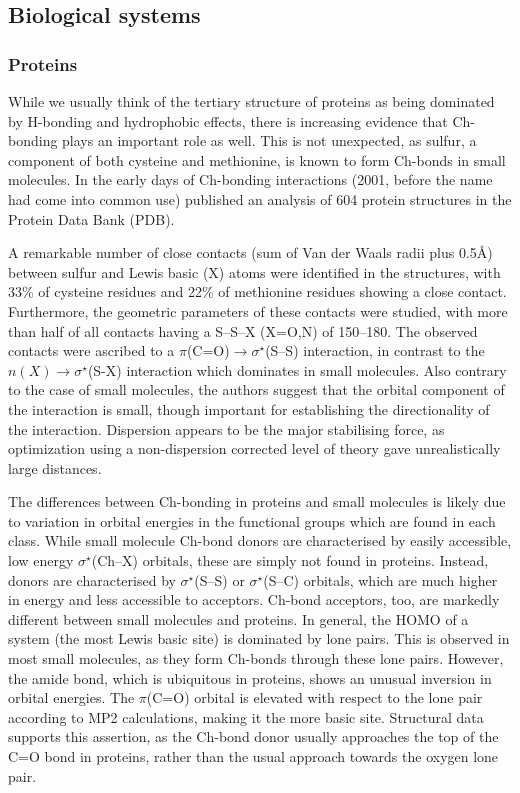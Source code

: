 \begin{refsection}
\subsection{Biological systems}

\subsubsection{Proteins}
While we usually think of the tertiary structure of proteins as being dominated by H-bonding and hydrophobic effects, there is increasing evidence that Ch-bonding plays an important role as well.
This is not unexpected, as sulfur, a component of both cysteine and methionine, is known to form Ch-bonds in small molecules.
In the early days of Ch-bonding interactions (2001, before the name had come into common use) \citeauthor{Iwaoka2001} published an analysis of 604 protein structures in the Protein Data Bank (PDB).\autocite{Iwaoka2001}

A remarkable number of close contacts (sum of Van der Waals radii plus 0.5\AA) between sulfur and Lewis basic (X) atoms were identified in the structures, with 33\% of cysteine residues and 22\% of methionine residues showing a close contact.
Furthermore, the geometric parameters of these contacts were studied, with more than half of all contacts having a S--S--X (X=O,N) of 150--180\degree.
The observed contacts were ascribed to a $\pi$(C=O)$\rightarrow \sigma^{\star}$(S--S) interaction, in contrast to the $n(X) \rightarrow \sigma^{\star}$(S-X) interaction which dominates in small molecules.
Also contrary to the case of small molecules, the authors suggest that the orbital component of the interaction is small, though important for establishing the directionality of the interaction.
Dispersion appears to be the major stabilising force, as optimization using a non-dispersion corrected level of theory gave unrealistically large distances.

The differences between Ch-bonding in proteins and small molecules is likely due to variation in orbital energies in the functional groups which are found in each class.
While small molecule Ch-bond donors are characterised by easily accessible, low energy $\sigma^{\star}$(Ch--X) orbitals, these are simply not found in proteins.
Instead, donors are characterised by $\sigma^{\star}$(S--S) or $\sigma^{\star}$(S--C) orbitals, which are much higher in energy and less accessible to acceptors.
Ch-bond acceptors, too, are markedly different between small molecules and proteins.
In general, the HOMO of a system (the most Lewis basic site) is dominated by lone pairs.
This is observed in most small molecules, as they form Ch-bonds through these lone pairs.
However, the amide bond, which is ubiquitous in proteins, shows an unusual inversion in orbital energies.
The $\pi$(C=O) orbital is elevated with respect to the lone pair according to MP2 calculations, making it the more basic site.
Structural data supports this assertion, as the Ch-bond donor usually approaches the top of the C=O bond in proteins, rather than the usual approach towards the oxygen lone pair.\autocite{Iwaoka2012}


\end{refsection}
